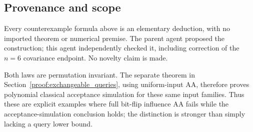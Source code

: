\subsection{Provenance and scope}\label{proof:thin_shell_obstruction:provenance-and-scope}

Every counterexample formula above is an elementary deduction, with no
imported theorem or numerical premise. The parent agent proposed the
construction; this agent independently checked it, including correction
of the \(n=6\) covariance endpoint. No novelty claim is made.

Both laws are permutation invariant. The separate theorem in
Section~\ref{proof:exchangeable_queries}, using uniform-input AA, therefore
proves polynomial classical acceptance simulation for these same input
families. Thus these are explicit examples where full bit-flip influence
AA fails while the acceptance-simulation conclusion holds; the
distinction is stronger than simply lacking a query lower bound.
